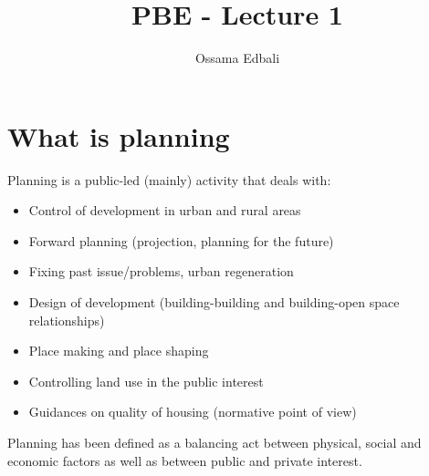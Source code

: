 \documentclass{article}
\title{PBE - Lecture 1}
\author{Ossama Edbali}
\begin{document}
	
	\maketitle	
	
	\section{What is planning}
	Planning is a public-led (mainly) activity that deals with:
	\begin{itemize}
		\item Control of development in urban and rural areas
		\item Forward planning (projection, planning for the future)
		\item Fixing past issue/problems, urban regeneration
		\item Design of development (building-building and building-open space relationships)
		\item Place making and place shaping
		\item Controlling land use in the public interest
		\item Guidances on quality of housing (normative point of view)
	\end{itemize} 
	
	Planning has been defined as a balancing act between physical, social and economic factors as well
	as between public and private interest.	
	
\end{document}
